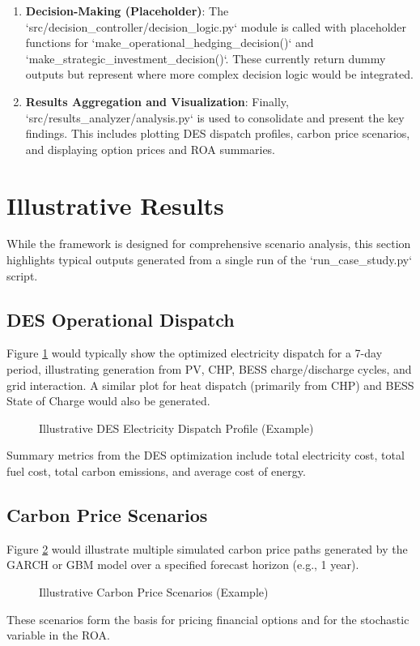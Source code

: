 \begin{enumerate}
    \item \textbf{Decision-Making (Placeholder)}:
    The `src/decision_controller/decision_logic.py` module is called with placeholder functions for `make_operational_hedging_decision()` and `make_strategic_investment_decision()`. These currently return dummy outputs but represent where more complex decision logic would be integrated.
    
    \item \textbf{Results Aggregation and Visualization}:
    Finally, `src/results_analyzer/analysis.py` is used to consolidate and present the key findings. This includes plotting DES dispatch profiles, carbon price scenarios, and displaying option prices and ROA summaries.
\end{enumerate}

\section{Illustrative Results}
While the framework is designed for comprehensive scenario analysis, this section highlights typical outputs generated from a single run of the `run_case_study.py` script.

\subsection{DES Operational Dispatch}
Figure \ref{fig:des_dispatch_placeholder} would typically show the optimized electricity dispatch for a 7-day period, illustrating generation from PV, CHP, BESS charge/discharge cycles, and grid interaction. A similar plot for heat dispatch (primarily from CHP) and BESS State of Charge would also be generated.
\begin{figure}[H]
    \centering
    \caption{Illustrative DES Electricity Dispatch Profile (Example)}
    \label{fig:des_dispatch_placeholder}
\end{figure}

Summary metrics from the DES optimization include total electricity cost, total fuel cost, total carbon emissions, and average cost of energy.

\subsection{Carbon Price Scenarios}
Figure \ref{fig:carbon_scenarios_placeholder} would illustrate multiple simulated carbon price paths generated by the GARCH or GBM model over a specified forecast horizon (e.g., 1 year).
\begin{figure}[H]
    \centering
    \caption{Illustrative Carbon Price Scenarios (Example)}
    \label{fig:carbon_scenarios_placeholder}
\end{figure}
These scenarios form the basis for pricing financial options and for the stochastic variable in the ROA.

